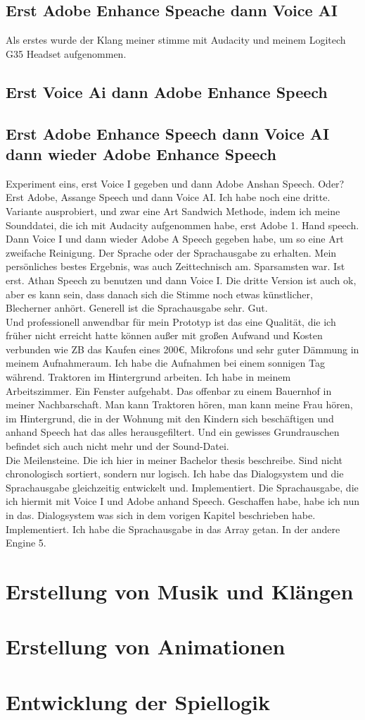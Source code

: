 \subsection{Erst Adobe Enhance Speache dann Voice AI}
Als erstes wurde der Klang meiner stimme mit Audacity und meinem Logitech G35 Headset aufgenommen.
\subsection{Erst Voice Ai dann Adobe Enhance Speech}
\subsection{Erst Adobe Enhance Speech dann Voice AI dann wieder Adobe Enhance Speech}
 
Experiment eins, erst Voice I gegeben und dann Adobe Anshan Speech. 		 Oder? Erst Adobe, Assange Speech und dann Voice AI.  Ich habe noch eine dritte.
\\
Variante ausprobiert, und zwar eine Art Sandwich Methode, indem ich meine Sounddatei, die ich mit Audacity aufgenommen habe, erst Adobe 1. Hand speech. Dann Voice I und dann wieder Adobe A Speech gegeben habe, um so eine Art zweifache Reinigung. Der Sprache oder der Sprachausgabe zu erhalten.     Mein persönliches bestes Ergebnis, was auch Zeittechnisch am. Sparsamsten war.  Ist erst.  Athan Speech zu benutzen und dann Voice I. Die dritte Version ist auch ok, aber es kann sein, dass danach sich die Stimme noch etwas künstlicher, Blecherner anhört.   Generell ist die Sprachausgabe sehr.  Gut.
\\
Und professionell anwendbar für mein Prototyp ist das eine Qualität, die ich früher nicht erreicht hatte können außer mit großen Aufwand und Kosten verbunden wie ZB das Kaufen eines 200€, Mikrofons und sehr guter Dämmung in meinem Aufnahmeraum. Ich habe die Aufnahmen bei einem sonnigen Tag während. Traktoren im Hintergrund arbeiten. Ich habe in meinem Arbeitszimmer. Ein Fenster aufgehabt. Das offenbar zu einem Bauernhof in meiner Nachbarschaft. Man kann Traktoren hören, man kann meine Frau hören, im Hintergrund, die in der Wohnung mit den Kindern sich beschäftigen und anhand Speech hat das alles herausgefiltert. Und ein gewisses Grundrauschen befindet sich auch nicht mehr und der Sound-Datei.
\\
Die Meilensteine.  Die ich hier in meiner Bachelor thesis beschreibe.  Sind nicht chronologisch sortiert, sondern nur logisch.  Ich habe das Dialogsystem und die Sprachausgabe gleichzeitig entwickelt und.  Implementiert.  Die Sprachausgabe, die ich hiermit mit Voice I und Adobe anhand Speech. Geschaffen habe, habe ich nun in das.  Dialogsystem was sich in dem vorigen Kapitel beschrieben habe. Implementiert. Ich habe die Sprachausgabe in das Array getan.		 In der andere Engine 5.
 
\section{Erstellung von Musik und Klängen}
\section{Erstellung von Animationen}
\section{Entwicklung der Spiellogik}